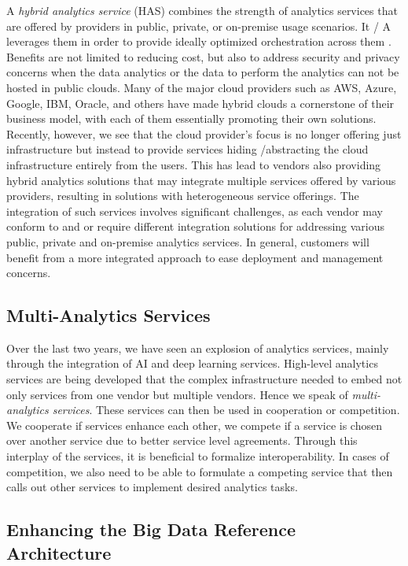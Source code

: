 A {\em hybrid analytics service} (HAS) combines the strength of analytics
services that are offered by providers in public, private, or
on-premise usage scenarios. It / A \NOTE{[HAS]} leverages them \NOTE{[x]} in order to provide ideally optimized
orchestration across them \NOTE{[x]}. Benefits are not limited to reducing cost,
but also to address security and privacy concerns when the data
analytics or the data to perform the analytics can not be hosted in
public clouds. Many of the major cloud providers such as AWS, Azure,
Google, IBM, Oracle, and others have made hybrid clouds a cornerstone
of their business model, with each of them essentially promoting their own
solutions. Recently, however, we see that the cloud provider's focus is no longer
offering just infrastructure but instead to provide services hiding /abstracting the
cloud infrastructure entirely from the users. 
This has lead to vendors
also providing hybrid analytics solutions that may integrate
multiple services offered by various providers, resulting in solutions
with heterogeneous service offerings. The integration of such services
involves significant challenges, as each vendor may conform to and or require different
integration solutions for addressing various public, private and on-premise
analytics services. In general, customers will benefit from a more
integrated approach to ease deployment and management concerns.

\subsection{Multi-Analytics Services}

Over the last two years, we have seen an explosion of analytics
services, mainly through the integration of AI and deep learning
services. High-level analytics services are being developed that  the
complex infrastructure needed to embed not only services from one
vendor but multiple vendors. Hence we speak of {\em multi-analytics
  services}. These services can then be used in cooperation or
competition. We cooperate if services enhance each other, we compete
if a service is chosen over another service due to better service
level agreements. Through this interplay of the services, it is
beneficial to formalize  interoperability. In cases of competition,
we also need to be able to formulate a competing service that then
calls out other services to implement desired analytics tasks.

\subsection{Enhancing the Big Data Reference Architecture}
\label{s:arch}

